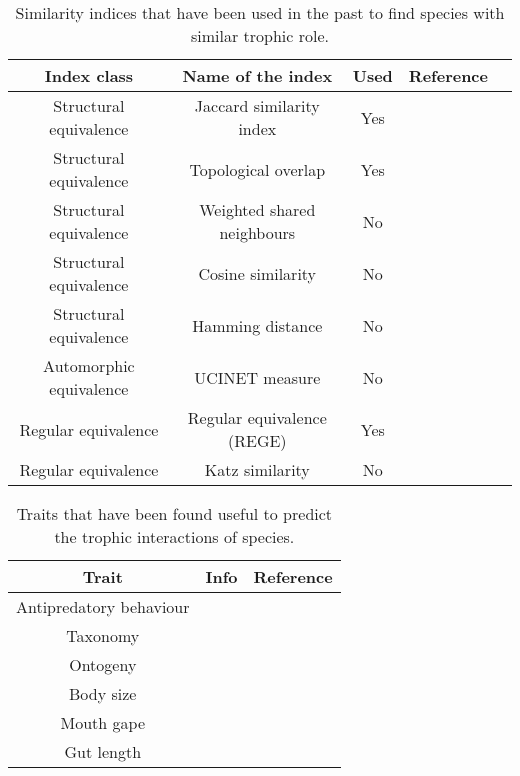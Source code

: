 \documentclass{article}
\begin{document}
	\begin{table} [htbp]
		\caption{Similarity indices that have been used in the past to find species with similar trophic role.}
		\begin{center}
			\begin{tabular} { c c c c p{10cm}}
				\hline
				Index class & Name of the index & Used & Reference \\
				\hline
				Structural equivalence & Jaccard similarity index & Yes & \citet{Yodzis1999} \\
				Structural equivalence & Topological overlap & Yes & \citet{Jordanplankton} \\
				Structural equivalence & Weighted shared neighbours & No & \citet{Newman2018} \\
				Structural equivalence & Cosine similarity & No & \citet{Newman2018} \\
				Structural equivalence & Hamming distance & No & \citet{Newman2018} \\
				Automorphic equivalence & UCINET measure & No & \citet{Wasserman1994} \\
				Regular equivalence & Regular equivalence (REGE) & Yes & \citet{Jordanplankton, Luczkovich2003} \\
				Regular equivalence & Katz similarity & No & \citet{Newman2018} \\
			\end{tabular}
			\label{tab:indices}
		\end{center}
	\end{table}


	\begin{table}[htpb]
		\begin{center}
			\begin{tabular} { c c c }
				\hline	
				Trait & Info & Reference \\
				\hline
				Antipredatory behaviour & & \citet{Vincent2020} \\
				Taxonomy & & \citet{Vincent2020} \\
				Ontogeny & & \citet{Vincent2020} \\
				Body size &  & \citet{Keppeler2020b}\\
				Mouth gape &  & \citet{Keppeler2020b}\\
				Gut length &  & \citet{Keppeler2020b}\\
			\end{tabular}
		\end{center}
	\caption{\label{tab:traits} Traits that have been found useful to predict the trophic interactions of species.}
	\end{table}
\end{document}
